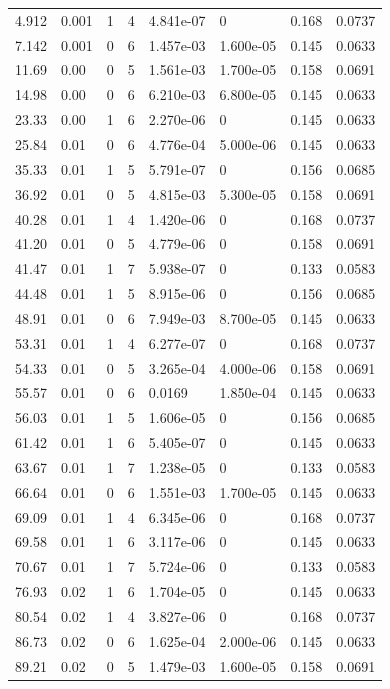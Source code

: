 \documentclass[preview]{standalone}
\begin{document}
{{\begin{tabular}{L{1.2cm}C{1.2cm} C{0.3cm}C{0.5cm} C{1.4cm}C{1.4cm} C{1.4cm}C{1.4cm}}
  4.912  &  0.001  & 1     &  4 &  4.841e-07  & 0  & 0.168 &  0.0737   \\ 
  7.142  &  0.001  & 0     &  6 &  1.457e-03  & 1.600e-05  & 0.145 &  0.0633   \\ 
  11.69  &  0.00  & 0     &  5 &  1.561e-03  & 1.700e-05  & 0.158 &  0.0691   \\ 
  14.98  &  0.00  & 0     &  6 &  6.210e-03  & 6.800e-05  & 0.145 &  0.0633   \\ 
  23.33  &  0.00  & 1     &  6 &  2.270e-06  & 0  & 0.145 &  0.0633   \\ 
  25.84  &  0.01  & 0     &  6 &  4.776e-04  & 5.000e-06  & 0.145 &  0.0633   \\ 
  35.33  &  0.01  & 1     &  5 &  5.791e-07  & 0  & 0.156 &  0.0685   \\ 
  36.92  &  0.01  & 0     &  5 &  4.815e-03  & 5.300e-05  & 0.158 &  0.0691   \\ 
  40.28  &  0.01  & 1     &  4 &  1.420e-06  & 0  & 0.168 &  0.0737   \\ 
  41.20  &  0.01  & 0     &  5 &  4.779e-06  & 0  & 0.158 &  0.0691   \\ 
  41.47  &  0.01  & 1     &  7 &  5.938e-07  & 0  & 0.133 &  0.0583   \\ 
  44.48  &  0.01  & 1     &  5 &  8.915e-06  & 0  & 0.156 &  0.0685   \\ 
  48.91  &  0.01  & 0     &  6 &  7.949e-03  & 8.700e-05  & 0.145 &  0.0633   \\ 
  53.31  &  0.01  & 1     &  4 &  6.277e-07  & 0  & 0.168 &  0.0737   \\ 
  54.33  &  0.01  & 0     &  5 &  3.265e-04  & 4.000e-06  & 0.158 &  0.0691   \\ 
  55.57  &  0.01  & 0     &  6 &  0.0169  & 1.850e-04  & 0.145 &  0.0633   \\ 
  56.03  &  0.01  & 1     &  5 &  1.606e-05  & 0  & 0.156 &  0.0685   \\ 
  61.42  &  0.01  & 1     &  6 &  5.405e-07  & 0  & 0.145 &  0.0633   \\ 
  63.67  &  0.01  & 1     &  7 &  1.238e-05  & 0  & 0.133 &  0.0583   \\ 
  66.64  &  0.01  & 0     &  6 &  1.551e-03  & 1.700e-05  & 0.145 &  0.0633   \\ 
  69.09  &  0.01  & 1     &  4 &  6.345e-06  & 0  & 0.168 &  0.0737   \\ 
  69.58  &  0.01  & 1     &  6 &  3.117e-06  & 0  & 0.145 &  0.0633   \\ 
  70.67  &  0.01  & 1     &  7 &  5.724e-06  & 0  & 0.133 &  0.0583   \\ 
  76.93  &  0.02  & 1     &  6 &  1.704e-05  & 0  & 0.145 &  0.0633   \\ 
  80.54  &  0.02  & 1     &  4 &  3.827e-06  & 0  & 0.168 &  0.0737   \\ 
  86.73  &  0.02  & 0     &  6 &  1.625e-04  & 2.000e-06  & 0.145 &  0.0633   \\ 
  89.21  &  0.02  & 0     &  5 &  1.479e-03  & 1.600e-05  & 0.158 &  0.0691   \\ 
\hline 
\end{tabular} 

}}
\end{document}
